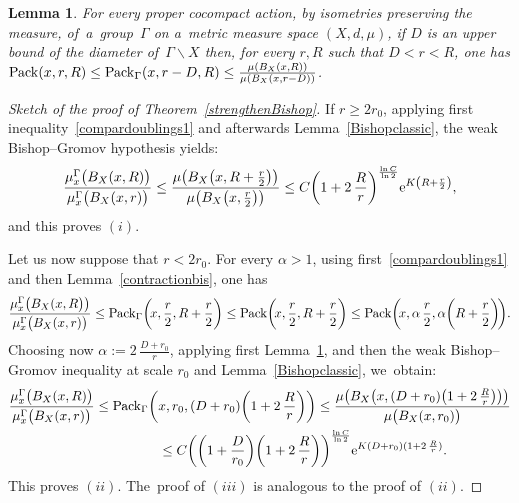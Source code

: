 \documentclass[10pt,a4paper]{amsart}
\numberwithin{equation}{section}
\newtheorem{Lemma}[theor]{Lemma}
\begin{document}
{\sloppy
\begin{Lemma}\label{CovervsPack0} For every proper cocompact action, by isometries preserving the measure, of~a~group~$\Gamma$ on a~metric measure space $(X,d, \mu)$, if $D$ is an upper bound of the diameter of~$ \Gamma \backslash X$ then, for every $r, R$ such that $D < r < R$, one has
${\rm Pack}(x,r,R)\le {\rm Pack}_\Gamma (x,r - D,R) \le \frac{\mu (B_X ( x, R))}{\mu (B_X (x, r- D))}$.
\end{Lemma}

}

\begin{proof}[Sketch of the proof of Theorem~\ref{strengthenBishop}]
If $r \ge 2 r_0$, applying first inequality~\eqref{compardoublings1} and afterwards Lemma~\ref{Bishopclassic}, the weak Bishop--Gromov hypothesis yields:
\begin{gather*}
\dfrac{\mu_{x}^{\Gamma} \big(B_X(x, R)\big)}{\mu_{x}^{\Gamma} \big(B_X (x, r)\big)}
\le \dfrac{\mu \big(B_X\big(x, R + \frac{r}{2}\big)\big)}{\mu \big(B_X\big(x,\frac{r}{2}\big)\big)}
\le C \bigg(1 +2 \, \frac{R}{r}\bigg)^{\frac{\ln C}{\ln 2}} {\rm e}^{K \left(R + \frac{r}{2}\right)},
\end{gather*}
and this proves $(i)$.

Let us now suppose that $r < 2 r_0$. For every $\alpha > 1$, using first~\eqref{compardoublings1} and then Lemma~\ref{contractionbis}, one has
\begin{gather*}
\dfrac{\mu_{x}^{\Gamma} \big(B_X (x, R\big)\big)}{\mu_{x}^{\Gamma}\big(B_X (x, r)\big)}
\le {\rm Pack}_\Gamma \bigg(\!x, \frac{r}{2}, R + \frac{r}{2}\bigg)
\le {\rm Pack} \bigg(\!x, \frac{r}{2}, R + \frac{r}{2}\bigg)
\le {\rm Pack} \bigg(\!x,\alpha\,\frac{r}{2}, \alpha \bigg(R + \frac{r}{2} \bigg)\!\bigg).
\end{gather*}
Choosing now $\alpha := 2\, \frac{D + r_0}{r}$, applying first Lemma~\ref{CovervsPack0}, and then the weak Bishop--Gromov inequality at scale $r_0$
and Lemma~\ref{Bishopclassic}, we~obtain:
\begin{gather*}
\dfrac{\mu_{x}^{\Gamma} \big(B_X(x, R)\big)}{\mu_{x}^{\Gamma} \big(B_X (x,r)\big)}
\le {\rm Pack}_\Gamma \bigg(x,r_0, (D+ r_0)\bigg(1 +2\,\frac{R}{r}\bigg)\bigg)
\le \dfrac{\mu \big(B_X \big(x, (D+ r_0) \big(1 +2\,\frac{R}{r}\big)\big)\big)}{\mu \big(B_X(x,r_0)\big)}
\\ \hphantom{\dfrac{\mu_{x}^{\Gamma} \big(B_X(x, R)\big)}{\mu_{x}^{\Gamma} \big(B_X (x,r)\big)}}
{}\le C \bigg(\bigg(1 + \frac{D}{r_0}\bigg)\bigg(1 +2\,\frac{R}{r}\bigg)\bigg)^{\frac{\ln C}{\ln 2}} {\rm e}^{K (D+ r_0) ( 1 +2 \, \frac{R}{r})}.
\end{gather*}
This proves $(ii)$. The~proof of $(iii)$ is analogous to the proof of $(ii)$.
\end{proof}
\end{document}
